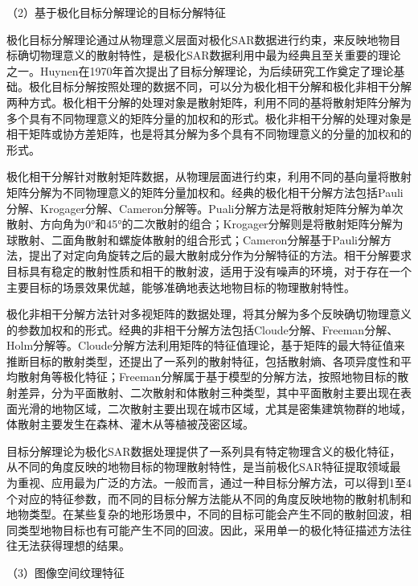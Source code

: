 （2）基于极化目标分解理论的目标分解特征

极化目标分解理论通过从物理意义层面对极化SAR数据进行约束，来反映地物目标确切物理意义的散射特性，是极化SAR数据利用中最为经典且至关重要的理论之一。Huynen在1970年首次提出了目标分解理论，为后续研究工作奠定了理论基础。极化目标分解按照处理的数据不同，可以分为极化相干分解和极化非相干分解两种方式。极化相干分解的处理对象是散射矩阵，利用不同的基将散射矩阵分解为多个具有不同物理意义的矩阵分量的加权和的形式。极化非相干分解的处理对象是相干矩阵或协方差矩阵，也是将其分解为多个具有不同物理意义的分量的加权和的形式。

极化相干分解针对散射矩阵数据，从物理层面进行约束，利用不同的基向量将散射矩阵分解为不同物理意义的矩阵分量加权和。经典的极化相干分解方法包括Pauli分解、Krogager分解、Cameron分解等。Puali分解方法是将散射矩阵分解为单次散射、方向角为0°和45°的二次散射的组合；Krogager分解则是将散射矩阵分解为球散射、二面角散射和螺旋体散射的组合形式；Cameron分解基于Pauli分解方法，提出了对定向角旋转之后的最大散射成分作为分解特征的方法。相干分解要求目标具有稳定的散射性质和相干的散射波，适用于没有噪声的环境，对于存在一个主要目标的场景效果优越，能够准确地表达地物目标的物理散射特性。

极化非相干分解方法针对多视矩阵的数据处理，将其分解为多个反映确切物理意义的参数加权和的形式。经典的非相干分解方法包括Cloude分解、Freeman分解、Holm分解等。Cloude分解方法利用矩阵的特征值理论，基于矩阵的最大特征值来推断目标的散射类型，还提出了一系列的散射特征，包括散射熵、各项异度性和平均散射角等极化特征；Freeman分解属于基于模型的分解方法，按照地物目标的散射差异，分为平面散射、二次散射和体散射三种类型，其中平面散射主要出现在表面光滑的地物区域，二次散射主要出现在城市区域，尤其是密集建筑物群的地域，体散射主要发生在森林、灌木从等植被茂密区域。

目标分解理论为极化SAR数据处理提供了一系列具有特定物理含义的极化特征，从不同的角度反映的地物目标的物理散射特性，是当前极化SAR特征提取领域最为重视、应用最为广泛的方法。一般而言，通过一种目标分解方法，可以得到1至4个对应的特征参数，而不同的目标分解方法能从不同的角度反映地物的散射机制和地物类型。在某些复杂的地形场景中，不同的目标可能会产生不同的散射回波，相同类型地物目标也有可能产生不同的回波。因此，采用单一的极化特征描述方法往往无法获得理想的结果。

（3）图像空间纹理特征

